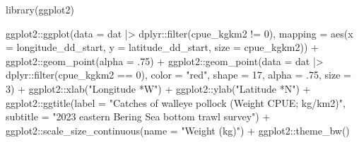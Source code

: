 \documentclass[
  letterpaper,
  oneside,
  open=any]{scrbook}
\newenvironment{Shaded}{\begin{snugshade}}{\end{snugshade}}
\newcommand{\AttributeTok}[1]{\textcolor[rgb]{0.40,0.45,0.13}{#1}}
\newcommand{\DecValTok}[1]{\textcolor[rgb]{0.68,0.00,0.00}{#1}}
\newcommand{\FunctionTok}[1]{\textcolor[rgb]{0.28,0.35,0.67}{#1}}
\newcommand{\NormalTok}[1]{\textcolor[rgb]{0.00,0.23,0.31}{#1}}
\newcommand{\SpecialCharTok}[1]{\textcolor[rgb]{0.37,0.37,0.37}{#1}}
\newcommand{\StringTok}[1]{\textcolor[rgb]{0.13,0.47,0.30}{#1}}
\begin{document}
\begin{Shaded}
\begin{Highlighting}[]
\FunctionTok{library}\NormalTok{(ggplot2)}

\NormalTok{ggplot2}\SpecialCharTok{::}\FunctionTok{ggplot}\NormalTok{(}\AttributeTok{data =}\NormalTok{ dat }\SpecialCharTok{|\textgreater{}}\NormalTok{ dplyr}\SpecialCharTok{::}\FunctionTok{filter}\NormalTok{(cpue\_kgkm2 }\SpecialCharTok{!=} \DecValTok{0}\NormalTok{), }
                \AttributeTok{mapping =} \FunctionTok{aes}\NormalTok{(}\AttributeTok{x =}\NormalTok{ longitude\_dd\_start, }
                              \AttributeTok{y =}\NormalTok{ latitude\_dd\_start, }
                              \AttributeTok{size =}\NormalTok{ cpue\_kgkm2)) }\SpecialCharTok{+} 
\NormalTok{  ggplot2}\SpecialCharTok{::}\FunctionTok{geom\_point}\NormalTok{(}\AttributeTok{alpha =}\NormalTok{ .}\DecValTok{75}\NormalTok{) }\SpecialCharTok{+}
\NormalTok{  ggplot2}\SpecialCharTok{::}\FunctionTok{geom\_point}\NormalTok{(}\AttributeTok{data =}\NormalTok{ dat }\SpecialCharTok{|\textgreater{}}\NormalTok{ dplyr}\SpecialCharTok{::}\FunctionTok{filter}\NormalTok{(cpue\_kgkm2 }\SpecialCharTok{==} \DecValTok{0}\NormalTok{), }
                      \AttributeTok{color =} \StringTok{"red"}\NormalTok{, }
                      \AttributeTok{shape =} \DecValTok{17}\NormalTok{,}
                      \AttributeTok{alpha =}\NormalTok{ .}\DecValTok{75}\NormalTok{,}
                      \AttributeTok{size =} \DecValTok{3}\NormalTok{) }\SpecialCharTok{+}
\NormalTok{  ggplot2}\SpecialCharTok{::}\FunctionTok{xlab}\NormalTok{(}\StringTok{"Longitude *W"}\NormalTok{) }\SpecialCharTok{+}
\NormalTok{  ggplot2}\SpecialCharTok{::}\FunctionTok{ylab}\NormalTok{(}\StringTok{"Latitude *N"}\NormalTok{) }\SpecialCharTok{+}
\NormalTok{  ggplot2}\SpecialCharTok{::}\FunctionTok{ggtitle}\NormalTok{(}\AttributeTok{label =} \StringTok{"Catches of walleye pollock (Weight CPUE; kg/km2)"}\NormalTok{, }
                   \AttributeTok{subtitle =} \StringTok{"2023 eastern Bering Sea bottom trawl survey"}\NormalTok{) }\SpecialCharTok{+}
\NormalTok{  ggplot2}\SpecialCharTok{::}\FunctionTok{scale\_size\_continuous}\NormalTok{(}\AttributeTok{name =} \StringTok{"Weight (kg)"}\NormalTok{) }\SpecialCharTok{+} 
\NormalTok{  ggplot2}\SpecialCharTok{::}\FunctionTok{theme\_bw}\NormalTok{()}
\end{Highlighting}
\end{Shaded}
\end{document}
